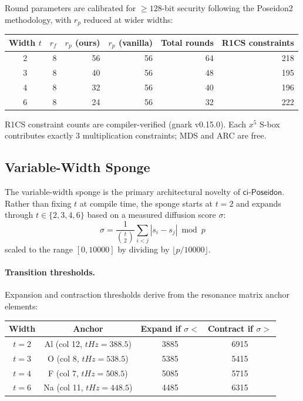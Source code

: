 \documentclass[preprint]{iacrtrans}
\newcommand{\ciposeidon}{\ensuremath{\mathsf{ci\text{-}Poseidon}}}
\begin{document}
Round parameters are calibrated for $\geq 128$-bit security following the
Poseidon2 methodology, with $r_p$ reduced at wider widths:

\begin{center}
\begin{tabular}{crrrrr}
\toprule
Width $t$ & $r_f$ & $r_p$ (ours) & $r_p$ (vanilla) & Total rounds & R1CS constraints \\
\midrule
2 & 8 & 56 & 56 & 64 & 218 \\
3 & 8 & 40 & 56 & 48 & 195 \\
4 & 8 & 32 & 56 & 40 & 196 \\
6 & 8 & 24 & 56 & 32 & 222 \\
\bottomrule
\end{tabular}
\end{center}

R1CS constraint counts are compiler-verified (gnark v0.15.0). Each $x^5$
S-box contributes exactly 3 multiplication constraints; MDS and ARC are free.

\subsection{Variable-Width Sponge}
\label{sec:sponge}

The variable-width sponge is the primary architectural novelty of
\ciposeidon{}. Rather than fixing $t$ at compile time, the sponge starts at
$t=2$ and expands through $t \in \{2, 3, 4, 6\}$ based on a measured
diffusion score $\sigma$:
\[
  \sigma = \frac{1}{\binom{t}{2}} \sum_{i < j} |s_i - s_j| \bmod p
\]
scaled to the range $[0, 10000]$ by dividing by $\lfloor p / 10000 \rfloor$.

\paragraph{Transition thresholds.} Expansion and contraction thresholds
derive from the resonance matrix anchor elements:

\begin{center}
\begin{tabular}{cccc}
\toprule
Width & Anchor & Expand if $\sigma <$ & Contract if $\sigma >$ \\
\midrule
$t=2$ & Al (col 12, $\mathit{tHz}=388.5$) & 3885 & 6915 \\
$t=3$ & O  (col 8,  $\mathit{tHz}=538.5$) & 5385 & 5415 \\
$t=4$ & F  (col 7,  $\mathit{tHz}=508.5$) & 5085 & 5715 \\
$t=6$ & Na (col 11, $\mathit{tHz}=448.5$) & 4485 & 6315 \\
\bottomrule
\end{tabular}
\end{center}
\end{document}
